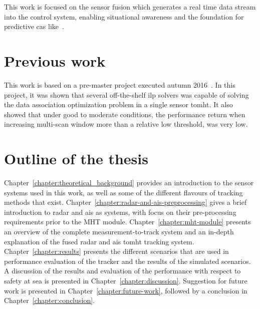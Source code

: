 This work is focused on the sensor fusion which generates a real time data stream into the control system, enabling situational awareness and the foundation for predictive \gls{cas} like~\cite{Hagen2017}.

\section{Previous work}\label{sec:previous_work}
This work is based on a pre-master project executed autumn 2016~\cite{Liland_2017}. In this project, it was shown that several off-the-shelf \gls{ilp} \glspl{solver} was capable of solving the data association optimization problem in a single sensor \gls{tomht}. It also showed that under good to moderate conditions, the performance return when increasing multi-scan window more than a relative low threshold, was very low.

\section{Outline of the thesis}\label{sec:outline_thesis}
Chapter~\ref{chapter:theoretical_background} provides an introduction to the sensor systems used in this work, as well as some of the different flavours of tracking methods that exist. Chapter~\ref{chapter:radar-and-ais-preprocessing} gives a brief introduction to radar and \gls{ais} as systems, with focus on their pre-processing requirements prior to the MHT module. Chapter~\ref{chapter:mht-module} presents an overview of the complete measurement-to-track system and an in-depth explanation of the fused \gls{radar} and \gls{ais} \gls{tomht} tracking system. Chapter~\ref{chapter:results} presents the different scenarios that are used in performance evaluation of the tracker and the results of the simulated scenarios. A discussion of the results and evaluation of the performance with respect to safety at sea is presented in Chapter~\ref{chapter:discussion}. Suggestion for future work is presented in Chapter~\ref{chapter:future-work}, followed by a conclusion in Chapter~\ref{chapter:conclusion}.